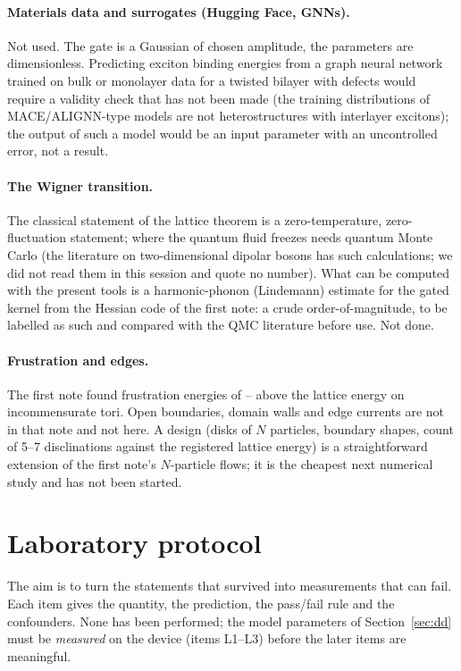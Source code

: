 \documentclass[11pt,a4paper]{article}
\begin{document}
\paragraph{Materials data and surrogates (Hugging Face, GNNs).} Not used. The gate is a Gaussian of chosen amplitude, the
parameters are dimensionless. Predicting exciton binding energies from a graph neural network trained on bulk or monolayer data
for a twisted bilayer with defects would require a validity check that has not been made (the training distributions of
MACE/ALIGNN-type models are not heterostructures with interlayer excitons); the output of such a model would be an input
parameter with an uncontrolled error, not a result.

\paragraph{The Wigner transition.} The classical statement of the lattice theorem is a zero-temperature, zero-fluctuation
statement; where the quantum fluid freezes needs quantum Monte Carlo (the literature on two-dimensional dipolar bosons has such
calculations; we did not read them in this session and quote no number). What
can be computed with the present tools is a harmonic-phonon (Lindemann) estimate for the gated kernel from the Hessian code of
the first note: a crude order-of-magnitude, to be labelled as such and compared with the QMC literature before use. Not done.

\paragraph{Frustration and edges.} The first note found frustration energies of \NFrusMin{}--\NFrusMax{} above the lattice energy on
incommensurate tori. Open boundaries, domain walls and edge currents are not in that note and not here. A design (disks of
$N$ particles, boundary shapes, count of 5--7 disclinations against the registered lattice energy) is a straightforward
extension of the first note's $N$-particle flows; it is the cheapest next numerical study and has not been started.

\section{Laboratory protocol}\label{sec:protocol}

The aim is to turn the statements that survived into measurements that can fail. Each item gives the quantity, the
prediction, the pass/fail rule and the confounders. None has been performed; the model parameters of Section~\ref{sec:dd} must be
\emph{measured} on the device (items L1--L3) before the later items are meaningful.
\end{document}

